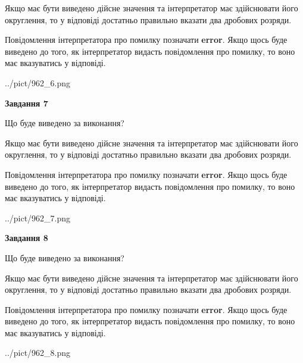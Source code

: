 \documentclass[12pt, ukrainian]{article}
\begin{document}
{\begin {Large}
Якщо має бути виведено дійсне значення та інтерпретатор має здійснювати його округлення, 
то у відповіді достатньо правильно вказати два дробових розряди.

Повідомлення інтерпретатора про помилку позначати \textbf{error}.
Якщо щось буде виведено до того, як інтерпретатор видасть повідомлення про помилку, 
то воно має вказуватись у відповіді. \par

\begin{center}
	{../pict/962_6.png}
\end{center}
\newpage

{\begin {center}\textbf{Завдання 7}\end {center}}\par
Що буде виведено за виконання? \par

Якщо має бути виведено дійсне значення та інтерпретатор має здійснювати його округлення, 
то у відповіді достатньо правильно вказати два дробових розряди.

Повідомлення інтерпретатора про помилку позначати \textbf{error}.
Якщо щось буде виведено до того, як інтерпретатор видасть повідомлення про помилку, 
то воно має вказуватись у відповіді. \par

\begin{center}
	{../pict/962_7.png}
\end{center}
\newpage

{\begin {center}\textbf{Завдання 8}\end {center}}\par
Що буде виведено за виконання? \par

Якщо має бути виведено дійсне значення та інтерпретатор має здійснювати його округлення, 
то у відповіді достатньо правильно вказати два дробових розряди.

Повідомлення інтерпретатора про помилку позначати \textbf{error}.
Якщо щось буде виведено до того, як інтерпретатор видасть повідомлення про помилку, 
то воно має вказуватись у відповіді. \par

\begin{center}
	{../pict/962_8.png}
\end{center}
\newpage


\end{Large}}
\end{document}
